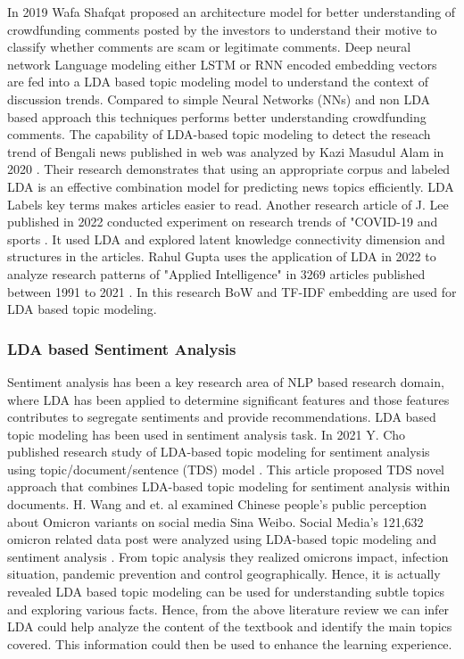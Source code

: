 \documentclass[sn-mathphys,Numbered]{sn-jnl}%
\theoremstyle{thmstyleone}%
\theoremstyle{thmstyletwo}%
\theoremstyle{thmstylethree}%
\begin{document}
In 2019 Wafa Shafqat \cite{shafqat2019topic} proposed an architecture model for better understanding of crowdfunding comments posted by the investors to understand their motive to classify whether comments are scam or legitimate comments. Deep neural network Language modeling either LSTM or RNN encoded embedding vectors are fed into a LDA based topic modeling model to understand the context of discussion trends. Compared to simple Neural Networks (NNs) and non LDA based approach this techniques performs better understanding crowdfunding comments. The capability of LDA-based topic modeling to detect the reseach trend of Bengali news published in web was analyzed by Kazi Masudul Alam in 2020 \cite{alam_bangla_2020}. Their research demonstrates that using an appropriate corpus and labeled LDA is an effective combination model for predicting news topics efficiently. LDA Labels key terms makes articles easier to read. Another research article of J. Lee published in 2022 conducted experiment on research trends of "COVID-19 and sports \cite{lee_lda_based_2022}. It used LDA and explored latent knowledge connectivity dimension and structures in the articles. Rahul Gupta  uses the application of LDA in 2022 to analyze research patterns of "Applied Intelligence" in 3269 articles published between 1991 to 2021 \cite{gupta_prediction_2022}. In this research BoW and TF-IDF embedding are used for LDA based topic modeling.

\subsubsection{LDA based Sentiment Analysis}

Sentiment analysis has been a key research area of NLP based research domain, where LDA has been applied to determine significant features and those features contributes to segregate sentiments and provide recommendations. LDA based topic modeling has been used in sentiment analysis task. In 2021 Y. Cho published research study of LDA-based topic modeling for sentiment analysis using topic/document/sentence (TDS) model \cite{farkhod_lda_based_2021}. This article proposed TDS novel approach that combines LDA-based topic modeling for sentiment analysis within documents. H. Wang and et. al examined Chinese people's public perception about Omicron variants on social media Sina Weibo. Social Media's 121,632 omicron related data post were analyzed using LDA-based topic modeling and sentiment analysis \cite{wang_exploring_2022}. From topic analysis they realized omicron\textquotesingle s impact, infection situation, pandemic prevention and control geographically. Hence, it is actually revealed LDA based topic modeling can be used for understanding subtle topics and exploring various facts. Hence, from the above literature review we can infer LDA could help analyze the content of the textbook and identify the main topics covered. This information could then be used to enhance the learning experience.
\end{document}
